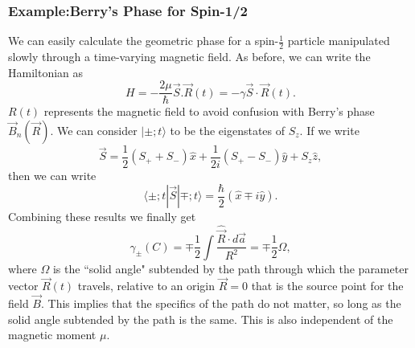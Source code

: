 \subsubsection{Example:Berry's Phase for Spin-1/2}
We can easily calculate the geometric phase for a spin-$\frac{1}{2}$
particle manipulated slowly through a time-varying magnetic field. As
before, we can write the Hamiltonian as
%
\begin{equation}
H= - \frac{2 \mu}{\hbar} \vec{S}.\vec{R}(t)=-\gamma \vec{S} \cdot \vec{R}(t) .
\end{equation}
%
$R(t)$ represents the magnetic field to avoid confusion with Berry's
phase $\vec{B}_n(\vec{R})$.  We can consider $|\pm ; t \rangle$ to be
the eigenstates of $S_z$. If we write
%
\begin{equation}
\vec{S}= \frac{1}{2} (S_++S_-)\hat{x}+\frac{1}{2i} (S_+-S_-) \hat{y} +S_z \hat{z} ,
\end{equation}
%
then we can write
%
\begin{equation}
\langle \pm ; t|\vec{S}|\mp;t \rangle = \frac{\hbar}{2} (\hat{x} \mp i \hat{y}).
\end{equation}
%
Combining these results we finally get
%
\begin{equation}
\gamma_{\pm} (C)= \mp \frac{1}{2} \int \frac{\hat{\vec{R}}\cdot d\vec{a}}{R^2}=\mp \frac{1}{2} \Omega,
\end{equation}
%
where $\Omega$ is the ``solid angle" subtended by the path through
which the parameter vector $\vec{R}(t)$ travels, relative to an origin
$\vec{R}=0$ that is the source point for the field $\vec{B}$.  This
implies that the specifics of the path do not matter, so long as the
solid angle subtended by the path is the same. This is also
independent of the magnetic moment $\mu$.
